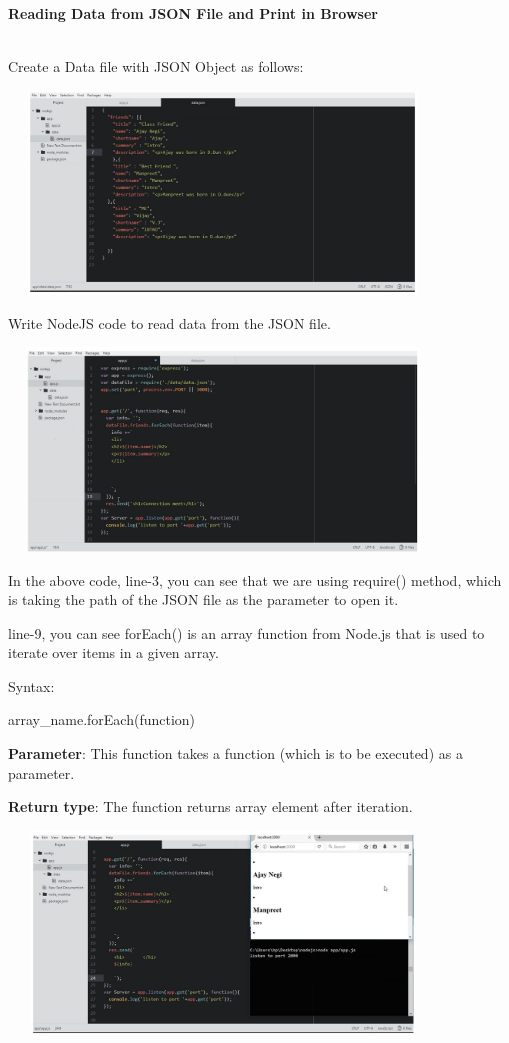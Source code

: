\documentclass[
]{article}
\author{}
\date{}
\begin{document}
{\textbf{Reading Data from JSON File and Print in Browser}}

{\textbf{}}\strut \\

Create a Data file with JSON Object as follows:{~}

\begin{center}
	\includegraphics*[width=4.48in, height=2.13in]{IMG-02-01}
\end{center}

Write NodeJS code to read data from the JSON file.

\begin{center}
	\includegraphics*[width=4.48in, height=2.13in]{IMG-02-02}
\end{center}

In the above code, line-3, you can see that we are using require()
method, which is taking the path of the JSON file as the parameter to
open it.

line-9, you can see forEach() is an array function from Node.js that is
used to iterate over items in a given array.

\hfill    

{Syntax:}

array\_name.forEach(function)

\hfill    

\textbf{Parameter}: This function takes a function (which is to be
executed) as a parameter.

\textbf{Return type}: The function returns array element after
iteration.

\begin{center}
	\includegraphics*[width=4.48in, height=2.13in]{IMG-02-03}
\end{center}
\end{document}
